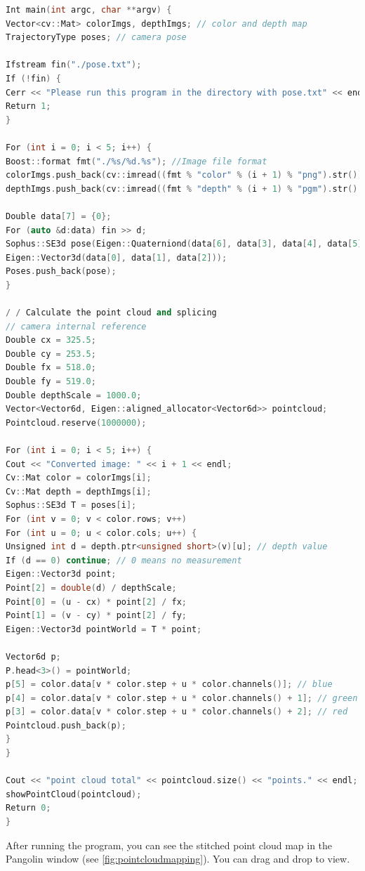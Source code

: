 \begin{lstlisting}[language=C++,caption=slambook/ch5/rgbd/jointMap.cpp(part)]
Int main(int argc, char **argv) {
Vector<cv::Mat> colorImgs, depthImgs; // color and depth map
TrajectoryType poses; // camera pose

Ifstream fin("./pose.txt");
If (!fin) {
Cerr << "Please run this program in the directory with pose.txt" << endl;
Return 1;
}

For (int i = 0; i < 5; i++) {
Boost::format fmt("./%s/%d.%s"); //Image file format
colorImgs.push_back(cv::imread((fmt % "color" % (i + 1) % "png").str()));
depthImgs.push_back(cv::imread((fmt % "depth" % (i + 1) % "pgm").str(), -1)); // Read the original image with -1

Double data[7] = {0};
For (auto &d:data) fin >> d;
Sophus::SE3d pose(Eigen::Quaterniond(data[6], data[3], data[4], data[5]),
Eigen::Vector3d(data[0], data[1], data[2]));
Poses.push_back(pose);
}

/ / Calculate the point cloud and splicing
// camera internal reference 
Double cx = 325.5;
Double cy = 253.5;
Double fx = 518.0;
Double fy = 519.0;
Double depthScale = 1000.0;
Vector<Vector6d, Eigen::aligned_allocator<Vector6d>> pointcloud;
Pointcloud.reserve(1000000);

For (int i = 0; i < 5; i++) {
Cout << "Converted image: " << i + 1 << endl;
Cv::Mat color = colorImgs[i];
Cv::Mat depth = depthImgs[i];
Sophus::SE3d T = poses[i];
For (int v = 0; v < color.rows; v++)
For (int u = 0; u < color.cols; u++) {
Unsigned int d = depth.ptr<unsigned short>(v)[u]; // depth value
If (d == 0) continue; // 0 means no measurement
Eigen::Vector3d point;
Point[2] = double(d) / depthScale;
Point[0] = (u - cx) * point[2] / fx;
Point[1] = (v - cy) * point[2] / fy;
Eigen::Vector3d pointWorld = T * point;

Vector6d p;
P.head<3>() = pointWorld;
p[5] = color.data[v * color.step + u * color.channels()]; // blue
p[4] = color.data[v * color.step + u * color.channels() + 1]; // green
p[3] = color.data[v * color.step + u * color.channels() + 2]; // red
Pointcloud.push_back(p);
}
}

Cout << "point cloud total" << pointcloud.size() << "points." << endl;
showPointCloud(pointcloud);
Return 0;
}
\end{lstlisting}

After running the program, you can see the stitched point cloud map in the Pangolin window (see \autoref{fig:pointcloudmapping}). You can drag and drop to view.

